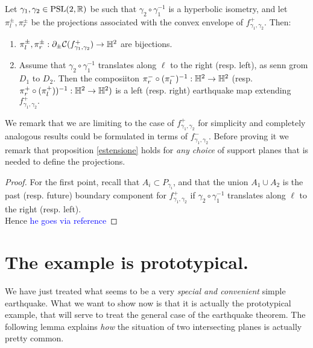 \begin{proposition}\label{estensione}
    Let $\gamma_1,\gamma_2 \in \text{PSL}(2,\mathbb{R})$ be such that $\gamma_2\circ\gamma_1^{-1}$ is a hyperbolic isometry, and let $\pi_l^\pm,\pi_r^\pm$ be the projections associated with the convex envelope of $f_{\gamma_1,\gamma_2}^+.$ Then:
    \begin{enumerate}
        \item $\pi_l^\pm,\pi_r^\pm:\partial_\pm\mathcal{C}(f_{\gamma_1,\gamma_2}^+)\to\mathbb{H}^2$ are bijections.
        \item Assume that $\gamma_2\circ\gamma_1^{-1}$ translates along $\ell$ to the right (resp. left), as senn grom $D_1$ to $D_2.$ Then the composiiton $\pi_r^-\circ(\pi_l^-)^{-1}:\mathbb{H}^2\to\mathbb{H}^2$ (resp. $\pi_r^+\circ(\pi_l^+))^{-1}:\mathbb{H}^2\to\mathbb{H}^2)$ is a left (resp. right) earthquake map extending $f_{\gamma_1,\gamma_2}^+.$
    \end{enumerate} 
\end{proposition}

We remark that we are limiting to the case of $f_{\gamma_1,\gamma_2}^+$ for simplicity and completely analogous results could be formulated in terms of $f_{\gamma_1,\gamma_2}^-.$ Before proving it we remark that proposition \ref{estensione} holds for \textit{any choice}  of support planes that is needed to define the projections.

\begin{proof}
    For the first point, recall that $A_i\subset P_{\gamma_i}$, and that the union $A_1\cup A_2$ is the past (resp. future) boundary component for $f_{\gamma_1,\gamma_2}^+$ if $\gamma_2\circ\gamma_1^{-1}$ translates along $\ell$ to the right (resp. left). \\
    Hence \textcolor{blue}{he goes via reference} 
\end{proof}

\section{The example is prototypical.} We have just treated what seems to be a very \textit{special and convenient} simple earthquake. What we want to show now is that it is actually the prototypical example, that will serve to treat the general case of the earthquake theorem. The following lemma explains \textit{how} the situation of two intersecting planes is actually pretty common. 


